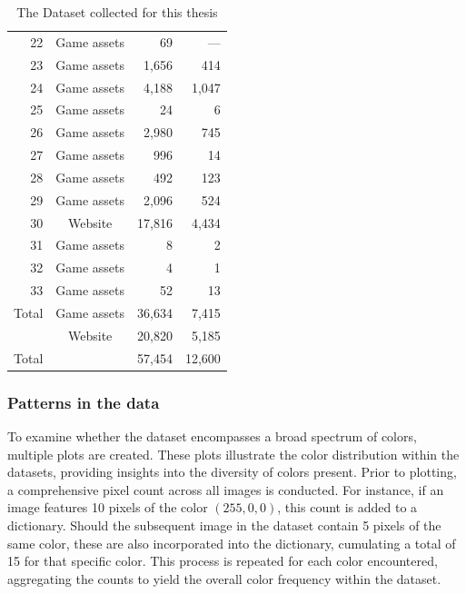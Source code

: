 \begin{table}[H]
\begin{adjustbox}{width=0.8\textwidth}
\begin{tabular}{|r|c|r|r|}
              22 & Game assets & 69 & --- \\
              23 & Game assets & 1,656 & 414 \\
              24 & Game assets & 4,188 & 1,047 \\
              25 & Game assets & 24 & 6 \\
              26 & Game assets & 2,980 & 745 \\
              27 & Game assets & 996 & 14 \\
              28 & Game assets & 492 & 123 \\
              29 & Game assets & 2,096 & 524 \\
              30 & Website & 17,816 & 4,434 \\
              31 & Game assets & 8 & 2 \\
              32 & Game assets & 4 & 1 \\
              33 & Game assets & 52 & 13 \\
              \hline
              Total & Game assets & 36,634 & 7,415 \\
                    & Website & 20,820 & 5,185 \\
              \hline
              Total & & 57,454 & 12,600 \\
              \hline
          \end{tabular}
        \end{adjustbox}
        \caption{The Dataset collected for this thesis}
        \label{tab:datasets}
    \end{table}

    \subsubsection{Patterns in the data}
    
    To examine whether the dataset encompasses a broad spectrum of colors, multiple plots are created. These plots illustrate the color distribution within the datasets, providing insights into the diversity of colors present. Prior to plotting, a comprehensive pixel count across all images is conducted. For instance, if an image features 10 pixels of the color $(255, 0, 0)$, this count is added to a dictionary. Should the subsequent image in the dataset contain 5 pixels of the same color, these are also incorporated into the dictionary, cumulating a total of 15 for that specific color. This process is repeated for each color encountered, aggregating the counts to yield the overall color frequency within the dataset.


